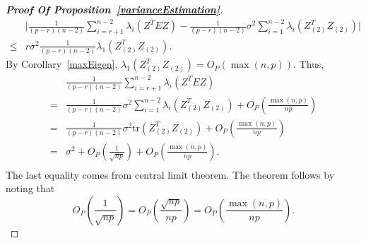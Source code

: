 \documentclass[review]{elsarticle}
\theoremstyle{plain}
\theoremstyle{definition}
\theoremstyle{remark}
\begin{document}
\begin{proof}[\textbf{Proof Of Proposition~\ref{varianceEstimation}}]
\begin{equation*}
\begin{aligned}
             &\Big|\frac{1}{(p-r)(n-2)}\sum_{i=r+1}^{n-2}\lambda_i(Z^T E Z)-
    \frac{1}{(p-r)(n-2)} \sigma^2\sum_{i=1}^{n-2}\lambda_{i}(Z_{(2)}^T Z_{(2)})\Big|
             \\
             \leq & r\sigma^2\frac{1}{(p-r)(n-2)} \lambda_1 (Z_{(2)}^T Z_{(2)}).
         \end{aligned}
     \end{equation*}
    By Corollary~\ref{maxEigen}, $\lambda_1 (Z_{(2)}^T Z_{(2)})=O_P(\max(n,p))$. 
    Thus,
     \begin{equation*}
         \begin{aligned}
             &\frac{1}{(p-r)(n-2)}\sum_{i=r+1}^{n-2}\lambda_i(Z^T E Z)\\
             =&
    \frac{1}{(p-r)(n-2)} \sigma^2\sum_{i=1}^{n-2}\lambda_{i}(Z_{(2)}^T Z_{(2)})
             +O_P(\frac{\max(n,p)}{np})\\
             =&
             \frac{1}{(p-r)(n-2)} \sigma^2\mathrm{tr}(Z_{(2)}^T Z_{(2)})
             +O_P(\frac{\max(n,p)}{np})\\
             =&
             \sigma^2
                +O_P(\frac{1}{\sqrt{np}})
             +O_P(\frac{\max(n,p)}{np}).\\
         \end{aligned}
     \end{equation*}
     The last equality comes from central limit theorem.
The theorem follows by noting that
$$
    O_{P}(\frac{1}{\sqrt{np}})=O_P(\frac{\sqrt{np}}{np})= O_P(\frac{\max (n,p)}{np}).
$$
\end{proof}




\end{document}
